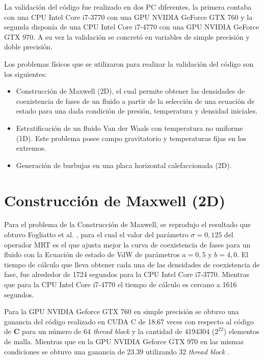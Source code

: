 La validación del código fue realizado en dos PC diferentes, la primera contaba con una CPU Intel Core i7-3770 con una GPU NVIDIA GeForce GTX 760 y la segunda disponía de una CPU Intel Core i7-4770 con una GPU NVIDIA GeForce GTX 970. A su vez la validación se concretó en variables de simple precisión y doble precisión.

Los problemas físicos  que se utilizaron para realizar la validación del código son los siguientes:

\begin{itemize}
    
    \item Construcción de Maxwell (2D), el cual permite obtener las densidades de coexistencia de fases de un fluido a partir de la selección de una ecuación de estado para una dada condición de  presión, temperatura y densidad iniciales.

    \item Estratificación de un fluido Van der Waals con temperatura no uniforme (1D). Este problema posee campo gravitatorio y temperaturas fijas en los extremos.

    \item Generación de burbujas en una placa horizontal calefaccionada (2D).

\end{itemize}

\section{Construcción de Maxwell (2D)}

Para el problema de la Construcción de Maxwell, se reprodujo el resultado que obtuvo Fogliatto et al. \cite{fogliatto2019simulation}, para el cual el valor del parámetro $\sigma = 0,125$ del operador MRT es el que ajusta mejor la curva de coexistencia de fases para un fluido con la Ecuación de estado de VdW de parámetros $ a = 0,5 $ y $ b = 4,0 $. El tiempo de cálculo que lleva obtener  cada una de las densidades de coexistencia de fase, fue alrededor de 1724 segundos para la CPU Intel Core i7-3770. Mientras que para la CPU Intel Core i7-4770 el tiempo de cálculo es cercano a 1616 segundos.

Para la GPU NVIDIA Geforce GTX 760 en simple precisión se obtuvo una ganancia del código realizado en \textsc{CUDA C} de 18.67 veces con respecto al código de \textbf{C} para un número de 64 \textit{thread block} y la cantidad de 4194304 ($2^{22}$) elementos de malla. Mientras que en la  GPU NVIDIA Geforce GTX 970 en las mismas condiciones se obtuvo una ganancia de 23.39 utilizando 32 \textit{thread block} .

